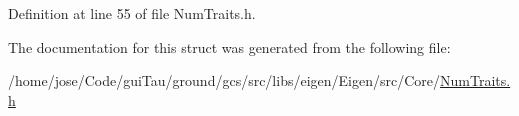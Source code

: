 Definition at line 55 of file Num\-Traits.\-h.



The documentation for this struct was generated from the following file\-:\begin{DoxyCompactItemize}
\item 
/home/jose/\-Code/gui\-Tau/ground/gcs/src/libs/eigen/\-Eigen/src/\-Core/\hyperlink{_num_traits_8h}{Num\-Traits.\-h}\end{DoxyCompactItemize}
